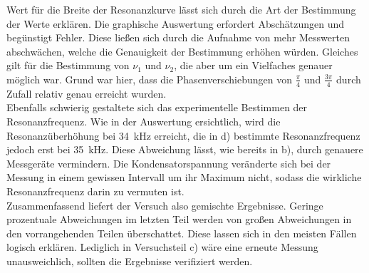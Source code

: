 Wert für die Breite der Resonanzkurve lässt sich durch die Art der Bestimmung der Werte erklären.
Die graphische Auswertung erfordert Abschätzungen und begünstigt Fehler. Diese ließen sich
durch die Aufnahme von mehr Messwerten abschwächen, welche die Genauigkeit der Bestimmung erhöhen würden.
Gleiches gilt für die Bestimmung von $\nu_1$ und $\nu_2$, die aber um ein Vielfaches
genauer möglich war. Grund war hier, dass die Phasenverschiebungen von $\frac{\pi}{4}$ und
$\frac{3 \pi}{4}$ durch Zufall relativ genau erreicht wurden.\\
Ebenfalls schwierig gestaltete sich das experimentelle Bestimmen der Resonanzfrequenz. Wie in
der Auswertung ersichtlich, wird die Resonanzüberhöhung bei \SI{34}{\kilo\hertz} erreicht,
die in d) bestimmte Resonanzfrequenz jedoch erst bei \SI{35}{\kilo\hertz}. Diese Abweichung
lässt, wie bereits in b), durch genauere Messgeräte vermindern. Die Kondensatorspannung veränderte sich
bei der Messung in einem gewissen Intervall um ihr Maximum nicht, sodass die wirkliche Resonanzfrequenz
darin zu vermuten ist.\\
Zusammenfassend liefert der Versuch also gemischte Ergebnisse. Geringe prozentuale Abweichungen
im letzten Teil werden von großen Abweichungen in den vorrangehenden Teilen überschattet.
Diese lassen sich in den meisten Fällen logisch erklären. Lediglich in Versuchsteil c)
wäre eine erneute Messung unausweichlich, sollten die Ergebnisse verifiziert werden.
\newpage
\nocite{*}
\printbibliography
